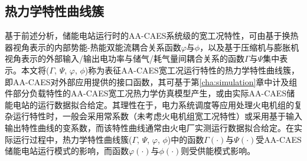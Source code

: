 \subsection{热力学特性曲线簇}
基于前述分析，储能电站运行时的AA-CAES系统级的宽工况特性，可由基于换热器视角表示的内部势能-热能双能流耦合关系函数$\varphi$与$\phi$，以及基于压缩机与膨胀机视角表示的外部输入/输出电功率与储气/耗气量间耦合关系的函数$\Gamma $与$\Psi$集中表示\cite{CAES-Wind-Rui-19}。本文将($\Gamma$, $\Psi$, $\varphi$, $\phi$)称为表征AA-CAES宽工况运行特性的热力学特性曲线簇，即AA-CAES对外部应用提供的接口函数，其可基于第\ref{cha:simulation}章中计及组件部分负载特性的AA-CAES宽工况热力学仿真模型产生，或由实际AA-CAES储能电站的运行数据拟合给定\cite{CAES-Wind-Rui-19}。其理性在于，电力系统调度等应用处理火电机组的复杂运行特性时，一般会采用常系数（未考虑火电机组宽工况特性）或采用基于输入输出特性曲线的变系数，而该特性曲线通常由火电厂实测运行数据拟合给定\cite{CAES-Wind-Rui-19}。在实际运行过程中，热力学特性曲线簇($\Gamma$, $\Psi$, $\varphi$, $\phi$)中的函数$\Gamma(\cdot)$与$\Psi(\cdot)$受AA-CAES储能电站运行模式的影响，而函数$\varphi(\cdot)$与$\phi(\cdot)$则受供能模式影响。



